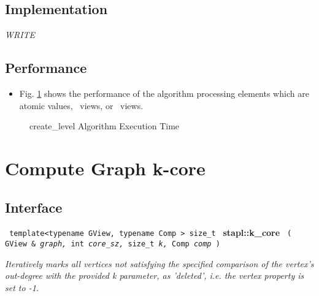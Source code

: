 \subsection{Implementation} \label{sec-create-level-alg-impl}

\textit{WRITE}

\subsection{Performance} \label{sec-create-level-alg-perf}

\begin{itemize}
\item
Fig. \ref{fig:cr-level-alg-exec-exper}
shows the performance of the algorithm processing
elements which are atomic values, \stl\ views, or \stapl\ views.
\end{itemize}

\begin{figure}[p]
\caption{ create\_level Algorithm Execution Time}
\label{fig:cr-level-alg-exec-exper}
\end{figure}


\section{ Compute Graph k-core}
\label{sec-k-core-alg}

\subsection{Interface} \label{sec-k-core-alg-inter}

\noindent
\texttt{%
template<typename GView, typename Comp >
\newline
size\_t 
}
\newline
\textbf{stapl::k\_core}%
\newline
\texttt{%
(
GView \&
\textit{graph,}%
int
\textit{core\_sz,}%
size\_t
\textit{k,}%
Comp
\textit{comp}%
)     
}
\vspace{0.4cm}

\textit{
Iteratively marks all vertices not satisfying the specified comparison of the vertex's out-degree with the provided k parameter, as 'deleted', i.e. the vertex property is set to -1.
}
\vspace{0.4cm}

